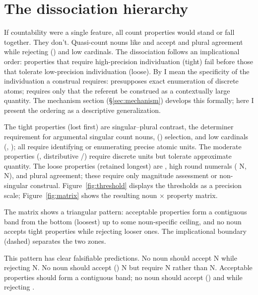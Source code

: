\documentclass[12pt,a4paper]{article}
\begin{document}
\section{The dissociation hierarchy}\label{sec:hierarchy}

If countability were a single feature, all count properties would stand or fall together. They don't. Quasi-count nouns like  and  accept  and plural agreement while rejecting () and low cardinals. The dissociation follows an implicational order: properties that require high-precision individuation (tight) fail before those that tolerate low-precision individuation (loose). By  I mean the specificity of the individuation a construal requires:  presupposes exact enumeration of discrete atoms;  requires only that the referent be construed as a contextually large quantity. The mechanism section (\S\ref{sec:mechanism}) develops this formally; here I present the ordering as a descriptive generalization.

The tight properties (lost first) are singular--plural contrast, the determiner requirement for argumental singular count nouns, () selection, and low cardinals (, ); all require identifying or enumerating precise atomic units. The moderate properties (, distributive /) require discrete units but tolerate approximate quantity. The loose properties (retained longest) are , high round numerals ( N,  N), and plural agreement; these require only magnitude assessment or non-singular construal. Figure~\ref{fig:threshold} displays the thresholds as a precision scale; Figure~\ref{fig:matrix} shows the resulting noun $\times$ property matrix.





The matrix shows a triangular pattern: acceptable properties form a contiguous band from the bottom (loosest) up to some noun-specific ceiling, and no noun accepts tight properties while rejecting looser ones. The implicational boundary (dashed) separates the two zones.

This pattern has clear falsifiable predictions. No noun should accept  N while rejecting  N. No noun should accept () N but require  N rather than  N. Acceptable properties should form a contiguous band; no noun should accept () and  while rejecting .
\end{document}
